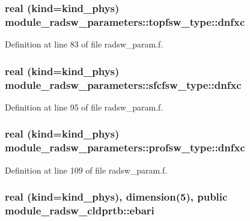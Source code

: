 \subsubsection[{\texorpdfstring{dnfxc}{dnfxc}}]{\setlength{\rightskip}{0pt plus 5cm}real (kind=kind\+\_\+phys) module\+\_\+radsw\+\_\+parameters\+::topfsw\+\_\+type\+::dnfxc}\hypertarget{group__module__radsw__main_gac1466bb6a9da92a59bdef51439320f35}{}\label{group__module__radsw__main_gac1466bb6a9da92a59bdef51439320f35}


Definition at line 83 of file radsw\+\_\+param.\+f.

\subsubsection[{\texorpdfstring{dnfxc}{dnfxc}}]{\setlength{\rightskip}{0pt plus 5cm}real (kind=kind\+\_\+phys) module\+\_\+radsw\+\_\+parameters\+::sfcfsw\+\_\+type\+::dnfxc}\hypertarget{group__module__radsw__main_ga0e5e6bfe14ffd1a9c1c8abfc730db4ba}{}\label{group__module__radsw__main_ga0e5e6bfe14ffd1a9c1c8abfc730db4ba}


Definition at line 95 of file radsw\+\_\+param.\+f.

\subsubsection[{\texorpdfstring{dnfxc}{dnfxc}}]{\setlength{\rightskip}{0pt plus 5cm}real (kind=kind\+\_\+phys) module\+\_\+radsw\+\_\+parameters\+::profsw\+\_\+type\+::dnfxc}\hypertarget{group__module__radsw__main_ga4d253ac17ae97351a0a3eb15ab4d55e4}{}\label{group__module__radsw__main_ga4d253ac17ae97351a0a3eb15ab4d55e4}


Definition at line 109 of file radsw\+\_\+param.\+f.

\subsubsection[{\texorpdfstring{ebari}{ebari}}]{\setlength{\rightskip}{0pt plus 5cm}real (kind=kind\+\_\+phys), dimension(5), public module\+\_\+radsw\+\_\+cldprtb\+::ebari}\hypertarget{group__module__radsw__main_ga3cc7ab844ca564bd3df02a687bbc2f43}{}\label{group__module__radsw__main_ga3cc7ab844ca564bd3df02a687bbc2f43}


